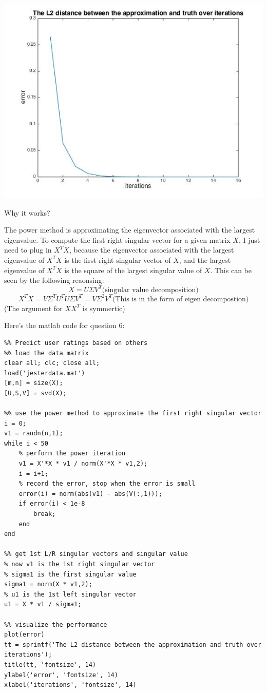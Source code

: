 \documentclass[paper=a4, fontsize=11pt]{scrartcl} %
\numberwithin{equation}{section} %
\numberwithin{figure}{section} %
\numberwithin{table}{section} %
\begin{document}
\begin{center}
\includegraphics[scale=.5]{6_err.jpg}
\end{center}


Why it works? 

The power method is approximating the eigenvector associated with the largest eigenvalue. To compute the first right singular vector for a given matrix $X$, I just need to plug in $X^TX$, because the eigenvector associated with the largest eigenvalue of $X^TX$ is the first right singular vector of $X$, and the largest eigenvalue of $X^TX$ is the square of the largest singular value of $X$. This can be seen by the following reaonsing: 
$$
X = U \Sigma V^T \text{(singular value decomposition)}
$$
$$
X^TX = V \Sigma^T U^T U \Sigma V^T = V \Sigma^2 V^T \text{(This is in the form of eigen decompostion)}
$$
(The argument for $XX^T$ is symmertic)

\newpage

Here's the matlab code for question 6: 
\begin{lstlisting}
%% Predict user ratings based on others
%% load the data matrix
clear all; clc; close all; 
load('jesterdata.mat')
[m,n] = size(X);
[U,S,V] = svd(X);

%% use the power method to approximate the first right singular vector
i = 0; 
v1 = randn(n,1);
while i < 50
    % perform the power iteration
    v1 = X'*X * v1 / norm(X'*X * v1,2);
    i = i+1;
    % record the error, stop when the error is small 
    error(i) = norm(abs(v1) - abs(V(:,1)));
    if error(i) < 1e-8
        break;
    end
end

%% get 1st L/R singular vectors and singular value
% now v1 is the 1st right singular vector
% sigma1 is the first singular value
sigma1 = norm(X * v1,2);
% u1 is the 1st left singular vector
u1 = X * v1 / sigma1;

%% visualize the performance
plot(error)
tt = sprintf('The L2 distance between the approximation and truth over iterations');
title(tt, 'fontsize', 14)
ylabel('error', 'fontsize', 14)
xlabel('iterations', 'fontsize', 14)
\end{lstlisting}
\end{document}
